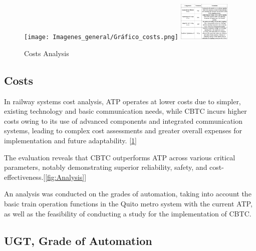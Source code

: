 \documentclass[conference]{IEEEtran}
\begin{document}
\begin{figure}[h]
    \centering
        \texttt{[image: Imagenes\_general/Gráfico\_costs.png]}
    \includegraphics[width=0.22\textwidth,scale=1]{Imagenes_general/tablas_costs.jpg}
    \caption{Costs Analysis}
    \label{fig:Costs Analysis}
\end{figure}
\subsection{Costs}
In railway systems cost analysis, ATP operates at lower costs due to simpler, existing technology and basic communication needs, while CBTC incurs higher costs owing to its use of advanced components and integrated communication systems, leading to complex cost assessments and greater overall expenses for implementation and future adaptability. [\ref{fig:Costs Analysis}]

The evaluation reveals that CBTC outperforms ATP across various critical parameters, notably demonstrating superior reliability, safety, and cost-effectiveness.[\ref{fig:Analysis}]

An analysis was conducted on the grades of automation, taking into account the basic train operation functions in the Quito metro system with the current ATP, as well as the feasibility of conducting a study for the implementation of CBTC.

\subsection{UGT, Grade of  Automation\cite{b17}}
\end{document}
